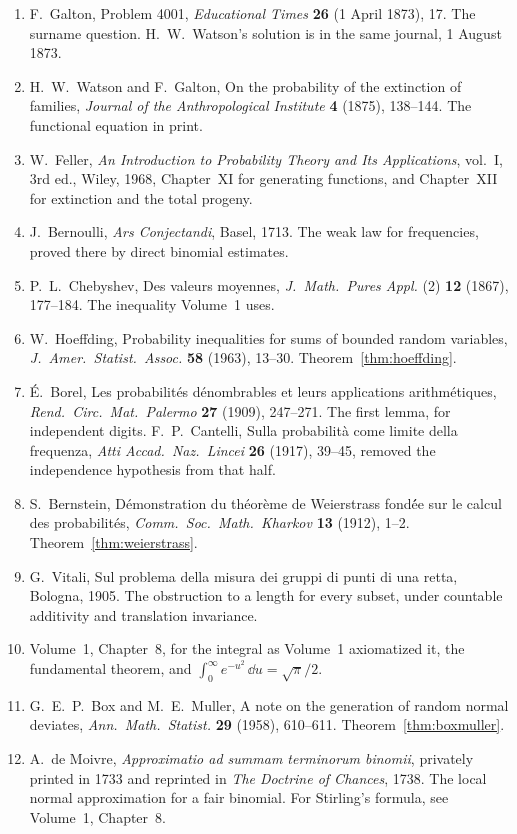 \begin{enumerate}
\item F.~Galton, Problem 4001, \emph{Educational Times} \textbf{26} (1 April 1873), 17. The surname question. H.~W.~Watson’s solution is in the same journal, 1 August 1873.
\item H.~W.~Watson and F.~Galton, On the probability of the extinction of families, \emph{Journal of the Anthropological Institute} \textbf{4} (1875), 138--144. The functional equation in print.
\item W.~Feller, \emph{An Introduction to Probability Theory and Its Applications}, vol.~I, 3rd ed., Wiley, 1968, Chapter~XI for generating functions, and Chapter~XII for extinction and the total progeny.
\item J.~Bernoulli, \emph{Ars Conjectandi}, Basel, 1713. The weak law for frequencies, proved there by direct binomial estimates.
\item P.~L.~Chebyshev, Des valeurs moyennes, \emph{J.\ Math.\ Pures Appl.} (2) \textbf{12} (1867), 177--184. The inequality Volume~1 uses.
\item W.~Hoeffding, Probability inequalities for sums of bounded random variables, \emph{J.\ Amer.\ Statist.\ Assoc.} \textbf{58} (1963), 13--30. Theorem~\ref{thm:hoeffding}.
\item \'E.~Borel, Les probabilit\'es d\'enombrables et leurs applications arithm\'etiques, \emph{Rend.\ Circ.\ Mat.\ Palermo} \textbf{27} (1909), 247--271. The first lemma, for independent digits. F.~P.~Cantelli, Sulla probabilit\`a come limite della frequenza, \emph{Atti Accad.\ Naz.\ Lincei} \textbf{26} (1917), 39--45, removed the independence hypothesis from that half.
\item S.~Bernstein, D\'emonstration du th\'eor\`eme de Weierstrass fond\'ée sur le calcul des probabilit\'es, \emph{Comm.\ Soc.\ Math.\ Kharkov} \textbf{13} (1912), 1--2. Theorem~\ref{thm:weierstrass}.
\item G.~Vitali, Sul problema della misura dei gruppi di punti di una retta, Bologna, 1905. The obstruction to a length for every subset, under countable additivity and translation invariance.
\item Volume~1, Chapter~8, for the integral as Volume~1 axiomatized it, the fundamental theorem, and $\int_0^{\infty}e^{-u^2}\,\dd u=\sqrt{\pi}/2$.
\item G.~E.~P.~Box and M.~E.~Muller, A note on the generation of random normal deviates, \emph{Ann.\ Math.\ Statist.} \textbf{29} (1958), 610--611. Theorem~\ref{thm:boxmuller}.
\item A.~de Moivre, \emph{Approximatio ad summam terminorum binomii}, privately printed in 1733 and reprinted in \emph{The Doctrine of Chances}, 1738. The local normal approximation for a fair binomial. For Stirling's formula, see Volume~1, Chapter~8.

\end{enumerate}
